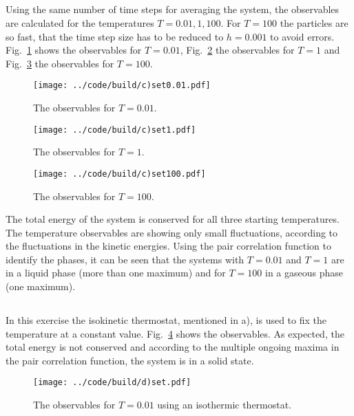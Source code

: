 \subsection{}
Using the same number of time steps for averaging the system, the observables are calculated for the temperatures $T = 0.01, 1, 100$. For $T=100$ the particles are so fast, that the time step size has to be reduced to $h=0.001$ to avoid errors. Fig.~\ref{fig:b_3} shows the observables for $T=0.01$, Fig.~\ref{fig:b_4} the observables for $T=1$  and Fig.~\ref{fig:b_5} the observables for $T=100$.

\begin{figure}[h]
    \centering
    \texttt{[image: ../code/build/c)set0.01.pdf]}
    \caption{The observables for $T=0.01$.}
    \label{fig:b_3}
\end{figure}

\begin{figure}[h]
    \centering
    \texttt{[image: ../code/build/c)set1.pdf]}
    \caption{The observables for $T=1$.}
    \label{fig:b_4}
\end{figure}

\begin{figure}[h]
    \centering
    \texttt{[image: ../code/build/c)set100.pdf]}
    \caption{The observables for $T=100$.}
    \label{fig:b_5}
\end{figure}

\noindent The total energy of the system is conserved for all three starting temperatures. The temperature observables are showing only small fluctuations, according to the fluctuations in the kinetic energies. Using the pair correlation function to identify the phases, it can be seen that the systems with $T=0.01$ and $T=1$ are in a liquid phase (more than one maximum) and for $T=100$ in a gaseous phase (one maximum).


\subsection{}
In this exercise the isokinetic thermostat, mentioned in a), is used to fix the temperature at a constant value. Fig.~\ref{fig:b_6} shows the observables. As expected, the total energy is not conserved and according to the multiple ongoing maxima in the pair correlation function, the system is in a solid state.

\begin{figure}[h]
    \centering
    \texttt{[image: ../code/build/d)set.pdf]}
    \caption{The observables for $T=0.01$ using an isothermic thermostat.}
    \label{fig:b_6}
\end{figure}

